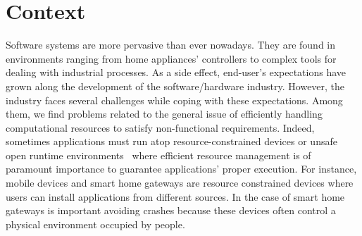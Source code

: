 \section{Context}

Software systems are more pervasive than ever nowadays.
They are found in environments ranging from home appliances' controllers to complex tools for dealing with industrial processes.
As a side effect, end-user's expectations have grown along the development of the software/hardware industry.
However, the industry faces several challenges while coping with these expectations.
Among them, we find problems related to the general issue of efficiently handling computational resources to satisfy non-functional requirements.
Indeed, sometimes applications must run atop resource-constrained devices or unsafe open runtime environments~\cite{baresi2006toward} where efficient resource management is of paramount importance to guarantee applications' proper execution.
For instance, mobile devices and smart home gateways are resource constrained devices where users can install applications from different sources.
In the case of smart home gateways is important avoiding crashes because these devices often control a physical environment occupied by people.

